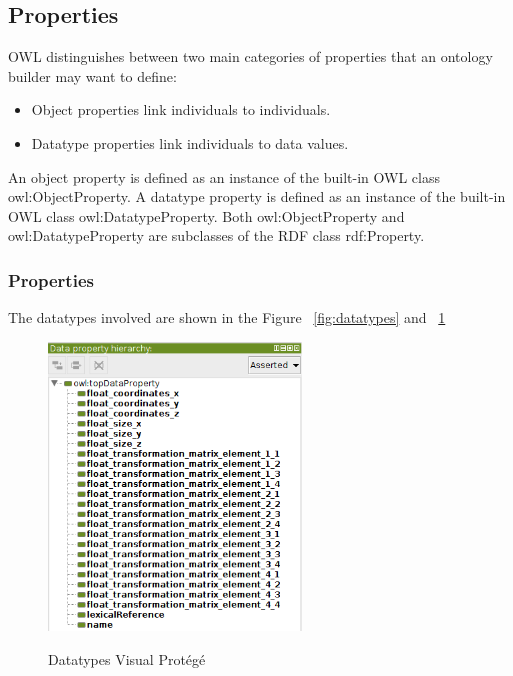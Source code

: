 \subsection*{Properties}
OWL distinguishes between two main categories of properties that an ontology builder may want to define:

\begin{itemize}
	\item Object properties link individuals to individuals.
	\item Datatype properties link individuals to data values.
\end{itemize}

An object property is defined as an instance of the built-in OWL class owl:ObjectProperty. A datatype property is defined as an instance of the built-in OWL class owl:DatatypeProperty. Both owl:ObjectProperty and owl:DatatypeProperty are subclasses of the RDF class rdf:Property.\\

\subsubsection*{Properties}
The datatypes involved are shown in the Figure ~\ref{fig:datatypes} and ~\ref{fig:datatypesProtege}

\begin{figure}[H]
\centering
\includegraphics[width=0.6\textwidth]{imgs/datatypeProtege.png}
\label{fig:datatypesProtege}
\caption{Datatypes Visual Prot\'eg\'e}
\end{figure}

